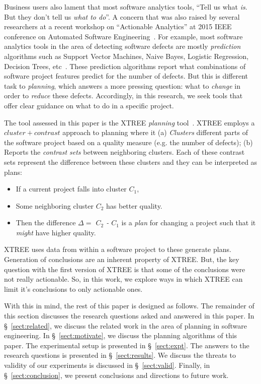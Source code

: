 \documentclass[sigconf, proceedings, 9pt]{acmart}
\newcommand{\tion}[1]{\S~\ref{sect:#1}}
\begin{document}
Business users also lament that most software analytics tools, ``Tell us what 
\textit{is}. But they don't tell us 
\textit{what to do}''. A concern that was also raised by several researchers at 
a recent workshop on ``Actionable Analytics'' at 2015 IEEE conference on 
Automated Software Engineering~\cite{hihn15}. For example, most software 
analytics tools in the area of detecting software defects are mostly 
\textit{prediction} algorithms such as Support Vector Machines, Naive Bayes, 
Logistic Regression, Decision Trees, etc~\cite{scikit-learn}. These prediction 
algorithms report what combinations of software project features predict for 
the number of defects. But this is different task to \textit{planning}, which 
answers a more pressing question: what to {\em change} in order to {\em reduce} 
these defects. Accordingly, in this research, we seek tools that offer clear 
guidance on what to do in a specific project.

The tool assessed in this paper is the XTREE \textit{planning} 
tool~\cite{krishna17a}. XTREE employs a $cluster+contrast$ approach to planning 
where it (a) \textit{Clusters} different parts of the software project based on 
a quality measure (e.g. the number of defects); (b) Reports the 
\textit{contrast sets} between neighboring clusters. Each of these contrast 
sets represent the difference between these clusters and they can  be 
interpreted as plans: 
\begin{itemize}
	\item If a current project falls into cluster $C_1$,
	\item Some neighboring cluster $C_2$ has better quality.
	\item Then the difference {\em $\Delta=$ $C_2$ - $C_1$} is a {\em plan} for 
	changing a  project such that it \textit{might} have   higher quality.
\end{itemize}

XTREE uses data from within a software project to these generate plans. 	
Generation of conclusions are an inherent property of XTREE. But, the key 
question with the first version of XTREE is that some of the conclusions were 
not really actionable. So, in this work, we explore ways in which XTREE can 
limit it's conclusions to only actionable ones. 


With this in mind, the rest of this paper is designed as follows. The remainder 
of this
section discusses the research questions asked and answered in this paper. In 
\tion{related}, we discuss the related work in the area of planning in software 
engineering. In \tion{motivate}, we discuss the planning algorithms of this 
paper. The experimental setup is presented in \tion{expt}. The answers to the 
research questions is presented in \tion{results}. We discuss the threats to 
validity of our experiments is discussed in \tion{valid}. Finally, in 
\tion{conclusion}, we present conclusions and directions to future work.
\end{document}

